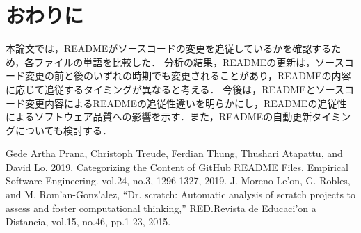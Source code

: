 \documentclass[uplatex,dvipdfmx,a4paper,twocolumn,base=11pt,jbase=11pt,ja=standard]{bxjsarticle}  %
\begin{document}




\section{おわりに}




本論文では，READMEがソースコードの変更を追従しているかを確認するため，各ファイルの単語を比較した．
分析の結果，READMEの更新は，ソースコード変更の前と後のいずれの時期でも変更されることがあり，READMEの内容に応じて追従するタイミングが異なると考える．
今後は，READMEとソースコード変更内容によるREADMEの追従性違いを明らかにし，READMEの追従性によるソフトウェア品質への影響を示す．また，READMEの自動更新タイミングについても検討する．






\begin{thebibliography}{1}
   Gede Artha Prana, Christoph Treude, Ferdian Thung, Thushari Atapattu, and David Lo. 2019. Categorizing the Content of GitHub README Files. Empirical Software Engineering. vol.24, no.3, 1296-1327, 2019. 
   J. Moreno-Le'on, G. Robles, and M. Rom'an-Gonz'alez, ``Dr. scratch: Automatic analysis of scratch projects to assess and foster computational thinking,'' RED.Revista de Educaci'on a Distancia, vol.15, no.46, pp.1-23, 2015.

\end{thebibliography}
\end{document}
